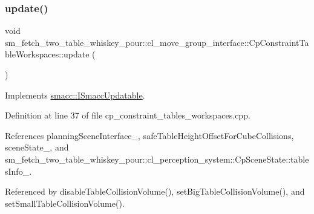 \subsubsection{\texorpdfstring{update()}{update()}}
{\footnotesize\ttfamily void sm\+\_\+fetch\+\_\+two\+\_\+table\+\_\+whiskey\+\_\+pour\+::cl\+\_\+move\+\_\+group\+\_\+interface\+::\+Cp\+Constraint\+Table\+Workspaces\+::update (\begin{DoxyParamCaption}{ }\end{DoxyParamCaption})\hspace{0.3cm}{\ttfamily [virtual]}}



Implements \hyperlink{classsmacc_1_1ISmaccUpdatable_a84ee0520cbefdb1d412bed54650b028e}{smacc\+::\+I\+Smacc\+Updatable}.



Definition at line 37 of file cp\+\_\+constraint\+\_\+tables\+\_\+workspaces.\+cpp.



References planning\+Scene\+Interface\+\_\+, safe\+Table\+Height\+Offset\+For\+Cube\+Collisions, scene\+State\+\_\+, and sm\+\_\+fetch\+\_\+two\+\_\+table\+\_\+whiskey\+\_\+pour\+::cl\+\_\+perception\+\_\+system\+::\+Cp\+Scene\+State\+::tables\+Info\+\_\+.



Referenced by disable\+Table\+Collision\+Volume(), set\+Big\+Table\+Collision\+Volume(), and set\+Small\+Table\+Collision\+Volume().


